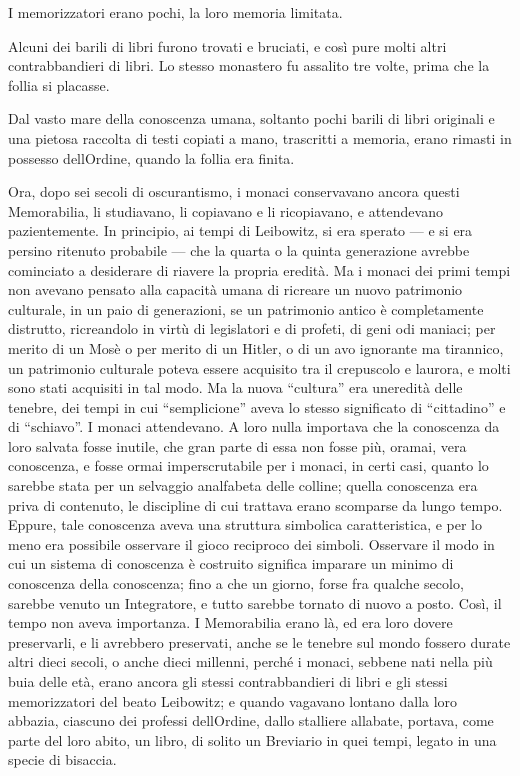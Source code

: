 I memorizzatori erano pochi, la loro memoria limitata.

Alcuni dei barili di libri furono trovati e bruciati, e così pure molti
altri contrabbandieri di libri. Lo stesso monastero fu assalito tre
volte, prima che la follia si placasse.

Dal vasto mare della conoscenza umana, soltanto pochi barili di libri
originali e una pietosa raccolta di testi copiati a mano, trascritti a
memoria, erano rimasti in possesso dell\textquotesingle Ordine, quando
la follia era finita.

Ora, dopo sei secoli di oscurantismo, i monaci conservavano ancora
questi Memorabilia, li studiavano, li copiavano e li ricopiavano, e
attendevano pazientemente. In principio, ai tempi di Leibowitz, si era
sperato --- e si era persino ritenuto probabile --- che la quarta o la
quinta generazione avrebbe cominciato a desiderare di riavere la propria
eredità. Ma i monaci dei primi tempi non avevano pensato alla capacità
umana di ricreare un nuovo patrimonio culturale, in un paio di
generazioni, se un patrimonio antico è completamente distrutto,
ricreandolo in virtù di legislatori e di profeti, di geni odi maniaci;
per merito di un Mosè o per merito di un Hitler, o di un avo ignorante
ma tirannico, un patrimonio culturale poteva essere acquisito tra il
crepuscolo e l\textquotesingle aurora, e molti sono stati acquisiti in
tal modo. Ma la nuova ``cultura'' era un\textquotesingle eredità delle
tenebre, dei tempi in cui ``semplicione'' aveva lo stesso significato di
``cittadino'' e di ``schiavo''. I monaci attendevano. A loro nulla
importava che la conoscenza da loro salvata fosse inutile, che gran
parte di essa non fosse più, oramai, vera conoscenza, e fosse ormai
imperscrutabile per i monaci, in certi casi, quanto lo sarebbe stata per
un selvaggio analfabeta delle colline; quella conoscenza era priva di
contenuto, le discipline di cui trattava erano scomparse da lungo tempo.
Eppure, tale conoscenza aveva una struttura simbolica caratteristica, e
per lo meno era possibile osservare il gioco reciproco dei simboli.
Osservare il modo in cui un sistema di conoscenza è costruito significa
imparare un minimo di conoscenza della conoscenza; fino a che un giorno,
forse fra qualche secolo, sarebbe venuto un Integratore, e tutto sarebbe
tornato di nuovo a posto. Così, il tempo non aveva importanza. I
Memorabilia erano là, ed era loro dovere preservarli, e li avrebbero
preservati, anche se le tenebre sul mondo fossero durate altri dieci
secoli, o anche dieci millenni, perché i monaci, sebbene nati nella più
buia delle età, erano ancora gli stessi contrabbandieri di libri e gli
stessi memorizzatori del beato Leibowitz; e quando vagavano lontano
dalla loro abbazia, ciascuno dei professi dell\textquotesingle Ordine,
dallo stalliere all\textquotesingle abate, portava, come parte del loro
abito, un libro, di solito un Breviario in quei tempi, legato in una
specie di bisaccia.

